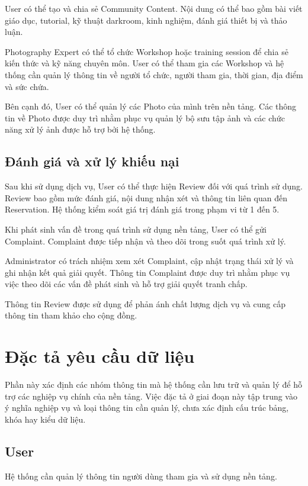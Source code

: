 User có thể tạo và chia sẻ Community Content. Nội dung có thể bao gồm bài viết giáo dục, tutorial, kỹ thuật darkroom, kinh nghiệm, đánh giá thiết bị và thảo luận.

Photography Expert có thể tổ chức Workshop hoặc training session để chia sẻ kiến thức và kỹ năng chuyên môn. User có thể tham gia các Workshop và hệ thống cần quản lý thông tin về người tổ chức, người tham gia, thời gian, địa điểm và sức chứa.

Bên cạnh đó, User có thể quản lý các Photo của mình trên nền tảng. Các thông tin về Photo được duy trì nhằm phục vụ quản lý bộ sưu tập ảnh và các chức năng xử lý ảnh được hỗ trợ bởi hệ thống.

\subsection{Đánh giá và xử lý khiếu nại}

Sau khi sử dụng dịch vụ, User có thể thực hiện Review đối với quá trình sử dụng. Review bao gồm mức đánh giá, nội dung nhận xét và thông tin liên quan đến Reservation. Hệ thống kiểm soát giá trị đánh giá trong phạm vi từ 1 đến 5.

Khi phát sinh vấn đề trong quá trình sử dụng nền tảng, User có thể gửi Complaint. Complaint được tiếp nhận và theo dõi trong suốt quá trình xử lý.

Administrator có trách nhiệm xem xét Complaint, cập nhật trạng thái xử lý và ghi nhận kết quả giải quyết. Thông tin Complaint được duy trì nhằm phục vụ việc theo dõi các vấn đề phát sinh và hỗ trợ giải quyết tranh chấp.

Thông tin Review được sử dụng để phản ánh chất lượng dịch vụ và cung cấp thông tin tham khảo cho cộng đồng.

\section{Đặc tả yêu cầu dữ liệu}

Phần này xác định các nhóm thông tin mà hệ thống cần lưu trữ và quản lý để hỗ trợ các nghiệp vụ chính của nền tảng. Việc đặc tả ở giai đoạn này tập trung vào ý nghĩa nghiệp vụ và loại thông tin cần quản lý, chưa xác định cấu trúc bảng, khóa hay kiểu dữ liệu.

\subsection{User}

Hệ thống cần quản lý thông tin người dùng tham gia và sử dụng nền tảng.

